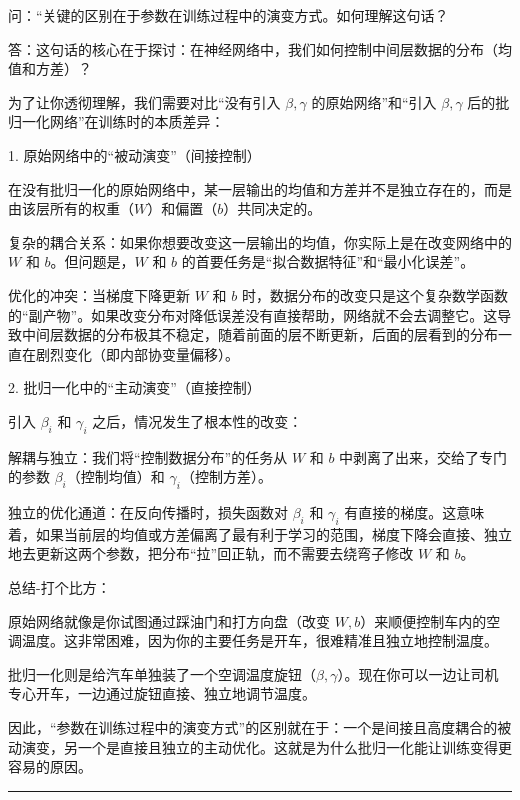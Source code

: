 \documentclass{article}
\begin{document}
{\color{blue}
问：“关键的区别在于参数在训练过程中的演变方式。如何理解这句话？

答：这句话的核心在于探讨：在神经网络中，我们如何控制中间层数据的分布（均值和方差）？

为了让你透彻理解，我们需要对比“没有引入 $\beta, \gamma$ 的原始网络”和“引入 $\beta, \gamma$ 后的批归一化网络”在训练时的本质差异：

1. 原始网络中的“被动演变”（间接控制）

在没有批归一化的原始网络中，某一层输出的均值和方差并不是独立存在的，而是由该层所有的权重（$W$）和偏置（$b$）共同决定的。

复杂的耦合关系：如果你想要改变这一层输出的均值，你实际上是在改变网络中的 $W$ 和 $b$。但问题是，$W$ 和 $b$ 的首要任务是“拟合数据特征”和“最小化误差”。

优化的冲突：当梯度下降更新 $W$ 和 $b$ 时，数据分布的改变只是这个复杂数学函数的“副产物”。如果改变分布对降低误差没有直接帮助，网络就不会去调整它。这导致中间层数据的分布极其不稳定，随着前面的层不断更新，后面的层看到的分布一直在剧烈变化（即内部协变量偏移）。

2. 批归一化中的“主动演变”（直接控制）

引入 $\beta_i$ 和 $\gamma_i$ 之后，情况发生了根本性的改变：

解耦与独立：我们将“控制数据分布”的任务从 $W$ 和 $b$ 中剥离了出来，交给了专门的参数 $\beta_i$（控制均值）和 $\gamma_i$（控制方差）。

独立的优化通道：在反向传播时，损失函数对 $\beta_i$ 和 $\gamma_i$ 有直接的梯度。这意味着，如果当前层的均值或方差偏离了最有利于学习的范围，梯度下降会直接、独立地去更新这两个参数，把分布“拉”回正轨，而不需要去绕弯子修改 $W$ 和 $b$。

总结-打个比方：

原始网络就像是你试图通过踩油门和打方向盘（改变 $W, b$）来顺便控制车内的空调温度。这非常困难，因为你的主要任务是开车，很难精准且独立地控制温度。

批归一化则是给汽车单独装了一个空调温度旋钮（$\beta, \gamma$）。现在你可以一边让司机专心开车，一边通过旋钮直接、独立地调节温度。

因此，“参数在训练过程中的演变方式”的区别就在于：一个是间接且高度耦合的被动演变，另一个是直接且独立的主动优化。这就是为什么批归一化能让训练变得更容易的原因。


}

\noindent\rule{\linewidth}{0.4pt}
\end{document}
